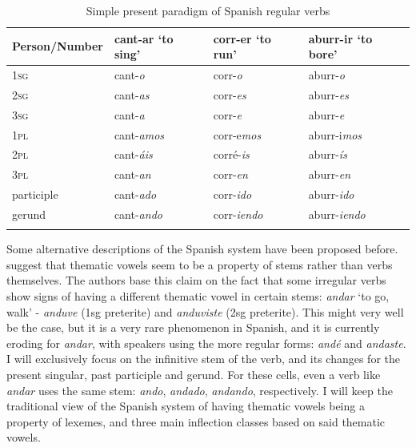 \begin{table}
  \centering
  \begin{tabular}{llll}
    \lsptoprule
    Person/Number & cant-ar `to sing' & corr-er `to run'     & aburr-ir `to bore'    \\
    \midrule
    \textsc{1sg}           & cant-\textit{o}           & corr-\textit{o}     & aburr-\textit{o}     \\
    \textsc{2sg}           & cant-\textit{as}          & corr-\textit{es}    & aburr-\textit{es}    \\
    \textsc{3sg}           & cant-\textit{a}           & corr-\textit{e}     & aburr-\textit{e}     \\
    \textsc{1pl}           & cant-\textit{amos}        & corr-e\textit{mos}  & aburr-i\textit{mos}  \\
    \textsc{2pl}           & cant-\textit{áis}         & corré-\textit{is}   & aburr-\textit{ís}    \\
    \textsc{3pl}           & cant-\textit{an}          & corr-\textit{en}    & aburr-\textit{en}    \\
    participle    & cant-\textit{ado}         & corr-\textit{ido}   & aburr-\textit{ido}   \\
    gerund        & cant-\textit{ando}        & corr-\textit{iendo} & aburr-\textit{iendo} \\
    \lspbottomrule
  \end{tabular}\caption{Simple present paradigm of Spanish regular verbs}\label{tab:sp-verb-paradigm}
\end{table}

Some alternative descriptions of the Spanish system have been proposed before. \textcite{Boye.2006} suggest that thematic vowels seem to be a property of stems rather than verbs themselves. The authors base this claim on the fact that some irregular verbs show signs of having a different thematic vowel in certain stems: \textit{andar} `to go, walk' - \textit{anduv\emph{e}} (1sg preterite) and \textit{anduv\emph{i}ste} (2sg preterite). This might very well be the case, but it is a very  rare phenomenon in Spanish, and it is currently eroding for \textit{andar}, with speakers using the more regular forms: \textit{andé} and \textit{andaste}. I will exclusively focus on the infinitive stem of the verb, and its changes for the present singular, past participle and gerund. For these cells, even a verb like \textit{andar} uses the same stem: \textit{ando}, \textit{andado}, \textit{andando}, respectively.
I will keep the traditional view of the Spanish system of having thematic vowels being a property of lexemes, and three main inflection classes based on said thematic vowels.

